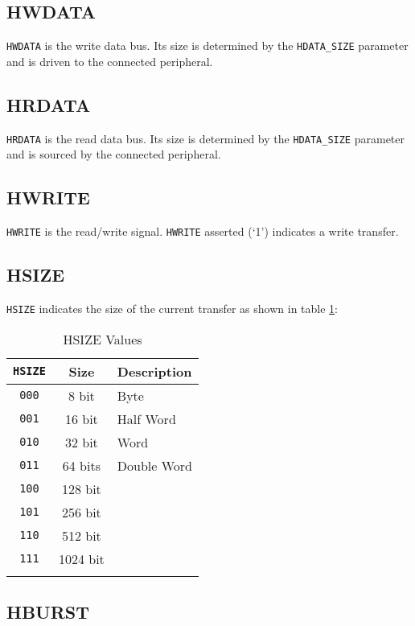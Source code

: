 \subsection{HWDATA}

\texttt{HWDATA} is the write data bus. Its size is determined by the
\texttt{HDATA\_SIZE} parameter and is driven to the connected
peripheral.

\subsection{HRDATA}

\texttt{HRDATA} is the read data bus. Its size is determined by the
\texttt{HDATA\_SIZE} parameter and is sourced by the connected
peripheral.

\subsection{HWRITE}

\texttt{HWRITE} is the read/write signal. \texttt{HWRITE} asserted (`1')
indicates a write transfer.

\subsection{HSIZE}

\texttt{HSIZE} indicates the size of the current transfer as shown in table \ref{tab:HSIZE}:

\begin{longtable}[c]{@{\extracolsep{\fill}}ccl}	
	\toprule 
	\textbf{\texttt{HSIZE}} & \textbf{Size} & \textbf{Description}\\
	\midrule
	\endhead 
	\texttt{000} & 8 bit    & Byte\\
	\texttt{001} & 16 bit   & Half Word\\
	\texttt{010} & 32 bit   & Word\\
	\texttt{011} & 64 bits  & Double Word\\
	\texttt{100} & 128 bit  &\\
	\texttt{101} & 256 bit  &\\
	\texttt{110} & 512 bit  &\\
	\texttt{111} & 1024 bit &\\
	\bottomrule 	
	\caption{HSIZE Values}
	\label{tab:HSIZE}
\end{longtable}

\subsection{HBURST}

